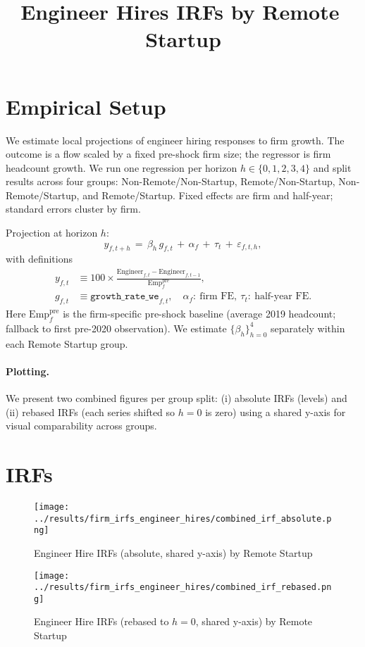 \documentclass[11pt]{article}
\title{Engineer Hires IRFs by Remote\,\texttimes\,Startup}
\date{\vspace{-1.5em}}
\begin{document}
\maketitle

\section*{Empirical Setup}
We estimate local projections of engineer hiring responses to firm growth. The outcome is a flow scaled by a fixed pre-shock firm size; the regressor is firm headcount growth. We run one regression per horizon $h\in\{0,1,2,3,4\}$ and split results across four groups: Non-Remote/Non-Startup, Remote/Non-Startup, Non-Remote/Startup, and Remote/Startup. Fixed effects are firm and half-year; standard errors cluster by firm.

Projection at horizon $h$:
\begin{equation*}
  y_{f,t+h} \,=\, \beta_h\, g_{f,t} \, + \, \alpha_f \, + \, \tau_t \, + \, \varepsilon_{f,t,h},
\end{equation*}
with definitions
\begin{align*}
  y_{f,t} &\equiv 100\times\frac{\text{Engineer}_{f,t} - \text{Engineer}_{f,t-1}}{\text{Emp}^{\text{pre}}_{f}}, \\
  g_{f,t} &\equiv \texttt{growth\_rate\_we}_{f,t}, \quad \alpha_f:\ \text{firm FE},\ \tau_t:\ \text{half-year FE}.
\end{align*}
Here $\text{Emp}^{\text{pre}}_{f}$ is the firm-specific pre-shock baseline (average 2019 headcount; fallback to first pre-2020 observation). We estimate $\{\beta_h\}^4_{h=0}$ separately within each Remote\,\texttimes\,Startup group.

\paragraph{Plotting.} We present two combined figures per group split: (i) absolute IRFs (levels) and (ii) rebased IRFs (each series shifted so $h{=}0$ is zero) using a shared y-axis for visual comparability across groups.

\section*{IRFs}
\begin{figure}[H]
  \centering
  \texttt{[image: ../results/firm\_irfs\_engineer\_hires/combined\_irf\_absolute.png]}
  \caption{Engineer Hire IRFs (absolute, shared y-axis) by Remote\,\texttimes\,Startup}
\end{figure}

\begin{figure}[H]
  \centering
  \texttt{[image: ../results/firm\_irfs\_engineer\_hires/combined\_irf\_rebased.png]}
  \caption{Engineer Hire IRFs (rebased to $h{=}0$, shared y-axis) by Remote\,\texttimes\,Startup}
\end{figure}

\end{document}
